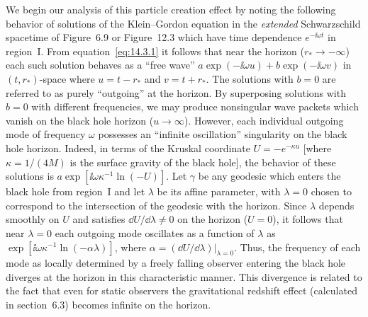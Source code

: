 We begin our analysis of this particle creation effect by noting the following behavior
of solutions of the Klein--Gordon equation in the \emph{extended} Schwarzschild
spacetime of Figure~6.9 or Figure~12.3 which have time dependence
\(e^{-\ii\omega t}\) in region~I. From equation~\eqref{eq:14.3.1} it follows that
near the horizon (\(r_*\longrightarrow-\infty\)) each such solution behaves as a
``free wave'' \(a\exp(-\ii\omega u)+b\exp(-\ii\omega v)\) in \((t,r_*)\)-space
where \(u=t-r_*\) and \(v=t+r_*\). The solutions with \(b=0\) are referred to as
purely ``outgoing'' at the horizon. By superposing solutions with \(b=0\) with
different frequencies, we may produce nonsingular wave packets which vanish on
the black hole horizon (\(u\longrightarrow\infty\)). However, each individual
outgoing mode of frequency \(\omega\) possesses an ``infinite oscillation''
singularity on the black hole horizon. Indeed, in terms of the Kruskal coordinate
\(U=-e^{-\kappa u}\) [where \(\kappa=1/(4M)\) is the surface gravity of the black
hole], the behavior of these solutions is
\(a\exp[\ii\omega\kappa^{-1}\ln(-U)]\). Let \(\gamma\) be any geodesic which
enters the black hole from region~I and let \(\lambda\) be its affine parameter, with
\(\lambda=0\) chosen to correspond to the intersection of the geodesic with the
horizon. Since \(\lambda\) depends smoothly on \(U\) and satisfies
\(\dd U/\dd\lambda\ne0\) on the horizon (\(U=0\)), it follows that near
\(\lambda=0\) each outgoing mode oscillates as a function of \(\lambda\) as
\(\exp[\ii\omega\kappa^{-1}\ln(-\alpha\lambda)]\), where
\(\alpha=(\dd U/\dd\lambda)|_{\lambda=0}\). Thus, the frequency of each mode as
locally determined by a freely falling observer entering the black hole diverges at
the horizon in this characteristic manner. This divergence is related to the fact that
even for static observers the gravitational redshift effect (calculated in section~6.3)
becomes infinite on the horizon.

